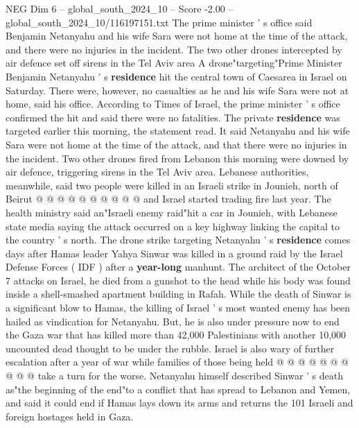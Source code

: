 \begin{textsample}{NEG Dim 6 – global\_south\_2024\_10 – Score -2.00 – global\_south\_2024\_10/116197151.txt}  \label{ex:f6_neg_051}
The prime minister ' s office said Benjamin Netanyahu and his wife Sara were not home at the time of the attack, and there were no injuries in the incident.
The two other drones intercepted by air defence set off sirens in the Tel Aviv area A drone"targeting"Prime Minister Benjamin Netanyahu ' s \textbf{residence} hit the central town of Caesarea in Israel on Saturday.
There were, however, no casualties as he and his wife Sara were not at home, said his office.
According to Times of Israel, the prime minister ' s office confirmed the hit and said there were no fatalities.
The private \textbf{residence} was targeted earlier this morning, the statement read.
It said Netanyahu and his wife Sara were not home at the time of the attack, and that there were no injuries in the incident.
Two other drones fired from Lebanon this morning were downed by air defence, triggering sirens in the Tel Aviv area.
Lebanese authorities, meanwhile, said two people were killed in an Israeli strike in Jounieh, north of Beirut @ @ @ @ @ @ @ @ @ @ and Israel started trading fire last year.
The health ministry said an"Israeli enemy raid"hit a car in Jounieh, with Lebanese state media saying the attack occurred on a key highway linking the capital to the country ' s north.
The drone strike targeting Netanyahu ' s \textbf{residence} comes days after Hamas leader Yahya Sinwar was killed in a ground raid by the Israel Defense Forces ( IDF ) after a \textbf{year-long} manhunt.
The architect of the October 7 attacks on Israel, he died from a gunshot to the head while his body was found inside a shell-smashed apartment building in Rafah.
While the death of Sinwar is a significant blow to Hamas, the killing of Israel ' s most wanted enemy has been hailed as vindication for Netanyahu.
But, he is also under pressure now to end the Gaza war that has killed more than 42,000 Palestinians with another 10,000 uncounted dead thought to be under the rubble.
Israel is also wary of further escalation after a year of war while families of those being held @ @ @ @ @ @ @ @ @ @ take a turn for the worse.
Netanyahu himself described Sinwar ' s death as"the beginning of the end"to a conflict that has spread to Lebanon and Yemen, and said it could end if Hamas lays down its arms and returns the 101 Israeli and foreign hostages held in Gaza.

\end{textsample}
